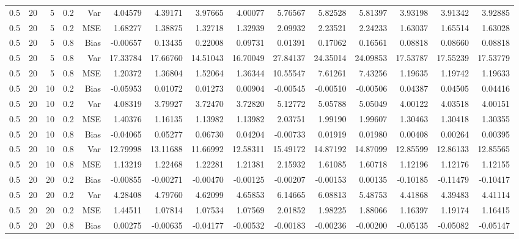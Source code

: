 \begin{table}[!htbp]
\begin{tabular}{lrrrrrrrrrrrrrr}
0.5 &  20 &  5 & 0.2 & Var & 4.04579 & 4.39171 & 3.97665 & 4.00077 & 5.76567 & 5.82528 & 5.81397 & 3.93198 & 3.91342 & 3.92885 \\
0.5 &  20 &  5 & 0.2 & MSE & 1.68277 & 1.38875 & 1.32718 & 1.32939 & 2.09932 & 2.23521 & 2.24233 & 1.63037 & 1.65514 & 1.63028 \\
0.5 &  20 &  5 & 0.8 & Bias & -0.00657 & 0.13435 & 0.22008 & 0.09731 & 0.01391 & 0.17062 & 0.16561 & 0.08818 & 0.08660 & 0.08818 \\
0.5 &  20 &  5 & 0.8 & Var & 17.33784 & 17.66760 & 14.51043 & 16.70049 & 27.84137 & 24.35014 & 24.09853 & 17.53787 & 17.55239 & 17.53779 \\
0.5 &  20 &  5 & 0.8 & MSE & 1.20372 & 1.36804 & 1.52064 & 1.36344 & 10.55547 & 7.61261 & 7.43256 & 1.19635 & 1.19742 & 1.19633 \\
0.5 &  20 & 10 & 0.2 & Bias & -0.05953 & 0.01072 & 0.01273 & 0.00904 & -0.00545 & -0.00510 & -0.00506 & 0.04387 & 0.04505 & 0.04416 \\
0.5 &  20 & 10 & 0.2 & Var & 4.08319 & 3.79927 & 3.72470 & 3.72820 & 5.12772 & 5.05788 & 5.05049 & 4.00122 & 4.03518 & 4.00151 \\
0.5 &  20 & 10 & 0.2 & MSE & 1.40376 & 1.16135 & 1.13982 & 1.13982 & 2.03751 & 1.99190 & 1.99607 & 1.30463 & 1.30418 & 1.30355 \\
0.5 &  20 & 10 & 0.8 & Bias & -0.04065 & 0.05277 & 0.06730 & 0.04204 & -0.00733 & 0.01919 & 0.01980 & 0.00408 & 0.00264 & 0.00395 \\
0.5 &  20 & 10 & 0.8 & Var & 12.79998 & 13.11688 & 11.66992 & 12.58311 & 15.49172 & 14.87192 & 14.87099 & 12.85599 & 12.86133 & 12.85565 \\
0.5 &  20 & 10 & 0.8 & MSE & 1.13219 & 1.22468 & 1.22281 & 1.21381 & 2.15932 & 1.61085 & 1.60718 & 1.12196 & 1.12176 & 1.12155 \\
0.5 &  20 & 20 & 0.2 & Bias & -0.00855 & -0.00271 & -0.00470 & -0.00125 & -0.00207 & -0.00153 & 0.00135 & -0.10185 & -0.11479 & -0.10417 \\
0.5 &  20 & 20 & 0.2 & Var & 4.28408 & 4.79760 & 4.62099 & 4.65853 & 6.14665 & 6.08813 & 5.48753 & 4.41868 & 4.39483 & 4.41114 \\
0.5 &  20 & 20 & 0.2 & MSE & 1.44511 & 1.07814 & 1.07534 & 1.07569 & 2.01852 & 1.98225 & 1.88066 & 1.16397 & 1.19174 & 1.16415 \\
0.5 &  20 & 20 & 0.8 & Bias & 0.00275 & -0.00635 & -0.04177 & -0.00532 & -0.00183 & -0.00236 & -0.00200 & -0.05135 & -0.05082 & -0.05147 \\

\end{tabular}
\end{table}
